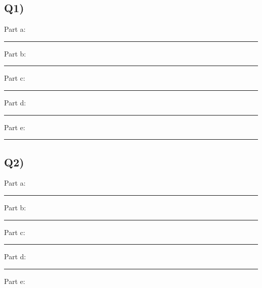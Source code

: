 \documentclass[
]{article}
\begin{document}
\hypertarget{q1}{%
\subsection{Q1)}\label{q1}}

Part a:

\begin{center}\rule{0.5\linewidth}{0.5pt}\end{center}

Part b:

\begin{center}\rule{0.5\linewidth}{0.5pt}\end{center}

Part c:

\begin{center}\rule{0.5\linewidth}{0.5pt}\end{center}

Part d:

\begin{center}\rule{0.5\linewidth}{0.5pt}\end{center}

Part e:

\begin{center}\rule{0.5\linewidth}{0.5pt}\end{center}

\newpage

\hypertarget{q2}{%
\subsection{Q2)}\label{q2}}

Part a:

\begin{center}\rule{0.5\linewidth}{0.5pt}\end{center}

Part b:

\begin{center}\rule{0.5\linewidth}{0.5pt}\end{center}

Part c:

\begin{center}\rule{0.5\linewidth}{0.5pt}\end{center}

Part d:

\begin{center}\rule{0.5\linewidth}{0.5pt}\end{center}

Part e:
\end{document}
